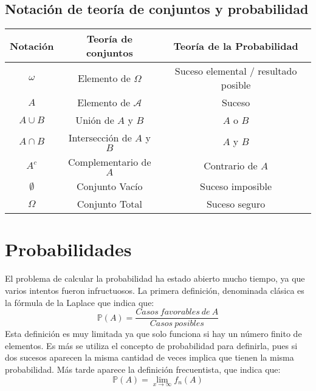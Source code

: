 \documentclass[11pt]{article}
\newcommand{\omg}{\omega}
\newcommand{\OMG}{\varOmega}
\theoremstyle{plain}
\begin{document}
        \subsection{Notación de teoría de conjuntos y probabilidad} %
        \label{sub:notación_de_teoría_de_conjuntos_y_probabilidad}
        \begin{center}
            \begin{tabular}{ |c|c|c| }
                \hline 
                    Notación & Teoría de conjuntos & Teoría de la Probabilidad \\
                \hline
                    $\omg$ & Elemento de $\OMG$ & Suceso elemental / resultado posible\\
                    $A$ & Elemento de $\mathcal{A}$ & Suceso \\
                    $A \cup B$ & Unión de $A$ y $B$ & $A$ o $B$\\
                    $A \cap B$ & Intersección de $A$ y $B$ & $A$ y $B$\\
                    $A^c$ & Complementario de $A$ & Contrario de $A$\\
                    $\emptyset$ & Conjunto Vacío & Suceso imposible\\
                    $\OMG$ & Conjunto Total & Suceso seguro\\
                \hline

                
            \end{tabular}  
        \end{center}
        \section{Probabilidades} %
        \label{sec:probabilidades}
            El problema de calcular la probabilidad ha estado abierto mucho tiempo, ya que varios intentos fueron infructuosos. La primera definición, denominada clásica es la fórmula de la Laplace que indica que:
            \begin{equation}
                \mathbb{P}(A) = \frac{Casos\ favorables\ de\ A}{Casos\ posibles}
            \end{equation}
            Esta definición es muy limitada ya que solo funciona si hay un número finito de elementos. Es más se utiliza el concepto de probabilidad para definirla, pues si dos sucesos aparecen la misma cantidad de veces implica que tienen la misma probabilidad. Más tarde aparece la definición frecuentista, que indica que:
            \begin{equation}
                \mathbb{P}(A) = \lim_{x\to\infty} f_{n} (A)
            \end{equation}
\end{document}

